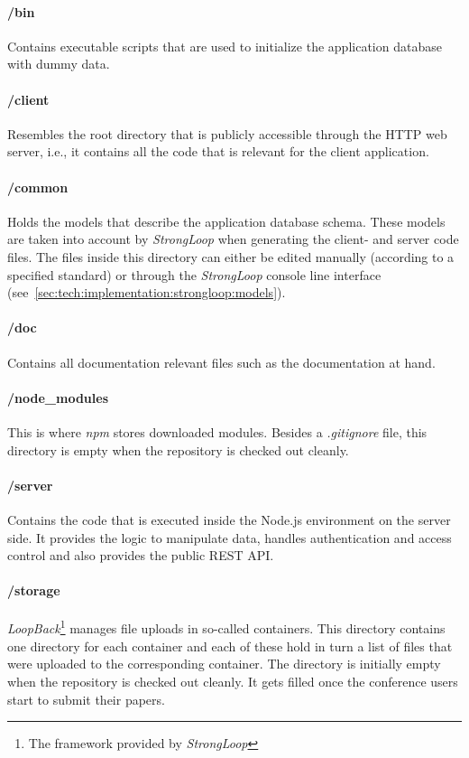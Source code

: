 \documentclass[nochapterpage,nopartpage,noheadingspace,numbersubsubsec,bigchapter,colorback,accentcolor=tud9c,10pt]{tudreport}
\begin{document}
  \paragraph{/bin}
    Contains executable scripts that are used to initialize the application database with dummy data.

  \paragraph{/client}
    Resembles the root directory that is publicly accessible through the HTTP web server, i.e., it contains all the code that is relevant for the client application.

  \paragraph{/common}
    Holds the models that describe the application database schema. These models are taken into account by \emph{StrongLoop} when generating the client- and server code files. The files inside this directory can either be edited manually (according to a specified standard) or through the \emph{StrongLoop} console line interface (see~\ref{sec:tech:implementation:strongloop:models}).

  \paragraph{/doc}
    Contains all documentation relevant files such as the documentation at hand.

  \paragraph{/node\_modules}
    This is where \emph{npm} stores downloaded modules. Besides a \emph{.gitignore} file, this directory is empty when the repository is checked out cleanly.

  \paragraph{/server}
    Contains the code that is executed inside the Node.js environment on the server side. It provides the logic to manipulate data, handles authentication and access control and also provides the public REST API.

  \paragraph{/storage}
    \emph{LoopBack}\footnote{The framework provided by \emph{StrongLoop}} manages file uploads in so-called containers. This directory contains one directory for each container and each of these hold in turn a list of files that were uploaded to the corresponding container. The directory is initially empty when the repository is checked out cleanly. It gets filled once the conference users start to submit their papers.
\end{document}

